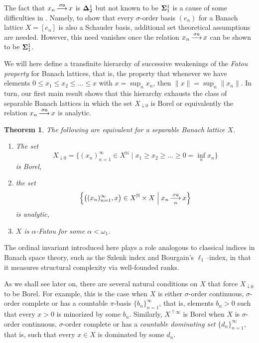 \documentclass[10pt]{amsart}
\newcommand{\norm}[1]{\lVert#1\rVert}
\newcommand{\conv}[2]{\mathop{\underset{#2}{\overset{#1}\longrightarrow}}}
\newcommand{\maps}[1]{\mathop{\overset{#1}\longrightarrow}}
\newcommand {\1}{\mathbb 1}
\newcommand {\N}{\mathbb N}
\newcommand{\om}{\omega}
\newcommand {\Del}{ \; \Big| \;}
\theoremstyle{plain}
\newtheorem{thm}{Theorem}[section]
\theoremstyle{definition}
\begin{document}
The fact that $x_n\maps{\sigma\sf o}x$ is ${\bf \Delta}^1_2$ but not known to be ${\bf \Sigma}^1_1$ is a cause of some difficulties in \cite{ARTT}. Namely, to show that every { $\sigma$-order basis} $(e_n)$ for a Banach lattice $X=[e_n]$ is also a Schauder basis, additional set theoretical assumptions are needed. However, this need vanishes once the relation $x_n\maps{\sigma\sf o}x$ can be shown to be ${\bf \Sigma}^1_1$.




We will here define a transfinite hierarchy of successive weakenings of the {\em Fatou property}  for Banach lattices, that is, the property that whenever we have elements $0\leqslant x_1\leqslant x_2\leqslant \ldots \leqslant x$ with $x=\sup_nx_n$, then $\norm x=\sup_n\norm {x_n}$. In turn, our first main result shows that this hierarchy exhausts the class of separable Banach lattices in which the set $X_{\downarrow0}$ is Borel or equivalently the relation $x_n\maps{\sigma\sf o}x$ is analytic.


\begin{thm}\label{thm:Fatou}
The following  are equivalent for a separable Banach lattice $X$.
\begin{enumerate}
\item The set 
$$
X_{\downarrow0}=\Big\{(x_n)_{n=1}^\infty\in X^\N\Del x_1\geqslant x_2\geqslant \ldots\geqslant 0=\inf_nx_n\Big\}
$$
is Borel,
\item the set 
$$
\Big\{ \big((x_n)_{n=1}^\infty,x\big)\in X^\N\times X\Del x_n\conv{\sigma\sf o}{n}x\Big\}
$$ 
is  analytic,
\item $X$ is $\alpha$-Fatou for some $\alpha<\om_1$.
\end{enumerate}
\end{thm}
The ordinal invariant introduced here plays a role analogous to classical indices in Banach space theory, such as the Szlenk index and Bourgain’s $\ell_1$--index, in that it measures structural complexity via well-founded ranks.



As we shall see later on, there are several natural conditions on $X$ that force $X_{\downarrow0}$ to be Borel. For example, this is the case when $X$ is either $\sigma$-order continuous, $\sigma$-order complete or has a countable $\pi$-basis $\{b_n\}_{n=1}^\infty$, that is, elements $b_n>0$ such that every $x>0$ is minorized by some $b_n$.  Similarly, $X^{\uparrow\infty}$ is Borel when $X$ is $\sigma$-order continuous, $\sigma$-order complete or has a {\em countable dominating set} $\{d_n\}_{n=1}^\infty$, that is, such that every $x\in X$ is dominated by some $d_n$.
\end{document}

